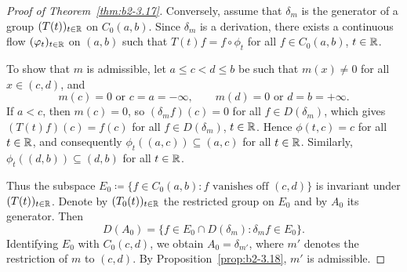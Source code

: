 \begin{proof}[Proof of Theorem~\ref{thm:b2-3.17}]
Conversely, assume that $\delta_{m}$ is the generator of a group $(T(t))_{t \in \mathbb{R}}$
on $C_{0}(a,b)$.
Since $\delta_{m}$ is a derivation, there exists a continuous flow $(\phi_{t})_{t \in \R}$
on $(a,b)$ such that $T(t)f = f \circ \phi_{t}$ for all $f \in C_{0}(a,b)$, $t \in \mathbb{R}$.

To show that $m$ is admissible, let $a \leq c < d \leq b$ be such that $m(x) \neq 0$
for all $x \in (c,d)$, and
\[
    m(c) = 0 \text{ or } c = a = -\infty,
    \qquad
    m(d) = 0 \text{ or } d = b = +\infty.
\]
If\/ $a < c$, then $m(c) = 0$, so $(\delta_{m}f)(c) = 0$ for all $f \in D(\delta_{m})$,
which gives $(T(t)f)(c) = f(c)$ for all $f \in D(\delta_{m})$, $t \in \mathbb{R}$.
Hence $\phi(t,c) = c$ for all $t \in \mathbb{R}$, and consequently
$\phi_{t}((a,c)) \subseteq (a,c)$ for all $t \in \mathbb{R}$.
Similarly, $\phi_{t}((d,b)) \subseteq (d,b)$ for all $t \in \mathbb{R}$.

Thus the subspace $E_{0} \coloneq \{f \in C_{0}(a,b) : f \text{ vanishes off } (c,d)\}$
is invariant under $(T(t))_{t \in \mathbb{R}}$.
Denote by $(T_{0}(t))_{t \in \mathbb{R}}$ the restricted group on $E_{0}$ and by $A_{0}$ its generator.
Then
\[
    D(A_{0}) = \{f \in E_{0} \cap D(\delta_{m}) : \delta_{m}f \in E_{0}\}.
\]
Identifying $E_{0}$ with $C_{0}(c,d)$, we obtain $A_{0} = \delta_{m'}$, where $m'$
denotes the restriction of\/ $m$ to $(c,d)$.
By Proposition~\ref{prop:b2-3.18}, $m'$ is admissible.
\end{proof}

